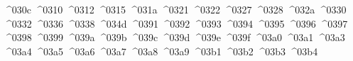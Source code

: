 {  ^^^^030c%
  ^^^^0310%
  ^^^^0312%
  ^^^^0315%
  ^^^^031a%
  ^^^^0321%
  ^^^^0322%
  ^^^^0327%
  ^^^^0328%
  ^^^^032a%
  ^^^^0330%
  ^^^^0332%
  ^^^^0336%
  ^^^^0338%
  ^^^^034d%
  ^^^^0391%
  ^^^^0392%
  ^^^^0393%
  ^^^^0394%
  ^^^^0395%
  ^^^^0396%
  ^^^^0397%
  ^^^^0398%
  ^^^^0399%
  ^^^^039a%
  ^^^^039b%
  ^^^^039c%
  ^^^^039d%
  ^^^^039e%
  ^^^^039f%
  ^^^^03a0%
  ^^^^03a1%
  ^^^^03a3%
  ^^^^03a4%
  ^^^^03a5%
  ^^^^03a6%
  ^^^^03a7%
  ^^^^03a8%
  ^^^^03a9%
  ^^^^03b1%
  ^^^^03b2%
  ^^^^03b3%
  ^^^^03b4%
}
